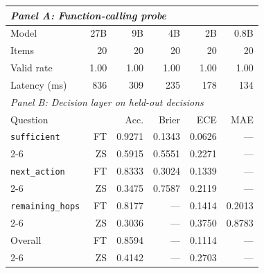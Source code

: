 \begin{tabular}{|l|r|r|r|r|r|}
\hline
\multicolumn{6}{|l|}{\emph{Panel A: Function-calling probe}} \\
\hline
Model & 27B & 9B & 4B & 2B & 0.8B \\
\hline
Items & 20 & 20 & 20 & 20 & 20 \\ %
\hline
Valid rate & 1.00 & 1.00 & 1.00 & 1.00 & 1.00 \\ %
\hline
Latency (ms) & 836 & 309 & 235 & 178 & 134 \\ %
\hline
\multicolumn{6}{|l|}{\emph{Panel B: Decision layer on held-out decisions}} \\
\hline
Question & & Acc. & Brier & ECE & MAE \\
\hline
\texttt{sufficient} & FT & 0.9271 & 0.1343 & 0.0626 & --- \\ %
\cline{2-6}
 & ZS & 0.5915 & 0.5551 & 0.2271 & --- \\ %
\hline
\texttt{next\_action} & FT & 0.8333 & 0.3024 & 0.1339 & --- \\ %
\cline{2-6}
 & ZS & 0.3475 & 0.7587 & 0.2119 & --- \\ %
\hline
\texttt{remaining\_hops} & FT & 0.8177 & --- & 0.1414 & 0.2013 \\ %
\cline{2-6}
 & ZS & 0.3036 & --- & 0.3750 & 0.8783 \\ %
\hline
Overall & FT & 0.8594 & --- & 0.1114 & --- \\ %
\cline{2-6}
 & ZS & 0.4142 & --- & 0.2703 & --- \\ %
\hline
\end{tabular}

